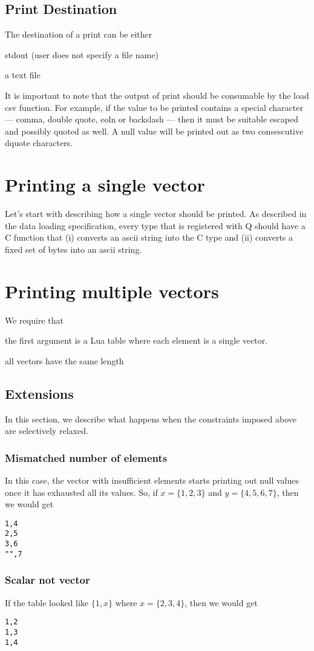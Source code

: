 \documentclass[letterpaper]{article}
\begin{document}
\subsection{Print Destination}

The destination of a print can be either 
\be
\item stdout (user does not specify a file name)
\item a text file 
\ee

It is important to note that the output of print should be consumable by the
load csv function. For example, if the value to be printed contains a special
character --- comma, double quote, eoln or backslash --- then it must be
suitable escaped and possibly quoted as well. A null value will be printed out
as two consescutive dquote characters.

\section{Printing a single vector}
\label{single_vector}

Let's start with describing how a single vector should be printed. As
described in the data loading specification, every type that is
registered with Q should have a C function that (i) converts an ascii
string into the C type and (ii) converts a fixed set of bytes into an ascii
string. 

\section{Printing multiple vectors}
\label{multiple_vectors}

We require that 
\be
\item 
the first argument is a Lua table where each element is a single vector. 
\item all vectors have the same length
\ee

\subsection{Extensions}
In this section, we describe what happens when the constraints imposed above are
selectively relaxed.
\subsubsection{Mismatched number of elements}
In this case, the vector with insufficient elements starts printing out null
values once it has exhausted all its values. So, if \(x = \{1, 2,3\}\) and \(y
= \{4, 5, 6, 7\}\), then we would get
\begin{verbatim}
1,4
2,5
3,6
"",7
\end{verbatim}

\subsubsection{Scalar not vector}
If the table looked like \(\{1, x\}\) where \(x = \{2, 3, 4 \}\), then we would
get
\begin{verbatim}
1,2
1,3
1,4
\end{verbatim}
\end{document}

